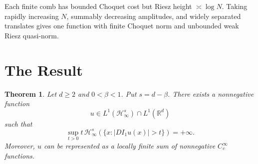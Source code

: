 \documentclass[11pt]{article}
\newtheorem{theorem}{Theorem}
\newcommand{\R}{\mathbb R}
\newcommand{\Hs}[1]{\mathcal H^{#1}_{\infty}}
\newcommand{\1}{\mathbf 1}
\begin{document}
Each finite comb has bounded Choquet cost but Riesz height $\asymp\log N$.
Taking rapidly increasing $N$, summably decreasing amplitudes, and widely
separated translates gives one function with finite Choquet norm and
unbounded weak Riesz quasi-norm.

\section*{The Result}

\begin{theorem}\label{thm:main}
Let $d\geq2$ and $0<\beta<1$.  Put $s=d-\beta$.  There exists a nonnegative
function
\[
 u\in L^1(\Hs{s})\cap L^1(\R^d)
\]
such that
\[
 \sup_{t>0}t\,\Hs{s}(\{x:\lvert DI_1u(x)\rvert>t\})=+\infty.
\]
Moreover, $u$ can be represented as a locally finite sum of nonnegative
$C_c^\infty$ functions.
\end{theorem}
\end{document}
